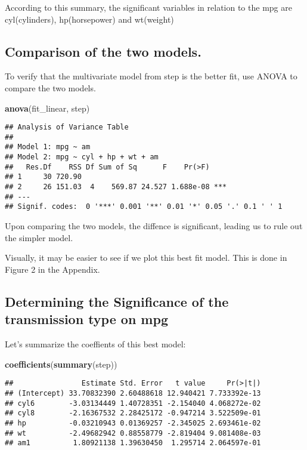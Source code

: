 \documentclass[]{article}
\newenvironment{Shaded}{\begin{snugshade}}{\end{snugshade}}
\newcommand{\KeywordTok}[1]{\textcolor[rgb]{0.13,0.29,0.53}{\textbf{#1}}}
\newcommand{\NormalTok}[1]{#1}
\begin{document}
According to this summary, the significant variables in relation to the
mpg are cyl(cylinders), hp(horsepower) and wt(weight)

\subsection{Comparison of the two
models.}\label{comparison-of-the-two-models.}

To verify that the multivariate model from step is the better fit, use
ANOVA to compare the two models.

\begin{Shaded}
\begin{Highlighting}[]
\KeywordTok{anova}\NormalTok{(fit_linear, step)}
\end{Highlighting}
\end{Shaded}

\begin{verbatim}
## Analysis of Variance Table
## 
## Model 1: mpg ~ am
## Model 2: mpg ~ cyl + hp + wt + am
##   Res.Df    RSS Df Sum of Sq      F    Pr(>F)    
## 1     30 720.90                                  
## 2     26 151.03  4    569.87 24.527 1.688e-08 ***
## ---
## Signif. codes:  0 '***' 0.001 '**' 0.01 '*' 0.05 '.' 0.1 ' ' 1
\end{verbatim}

Upon comparing the two models, the diffence is significant, leading us
to rule out the simpler model.

Visually, it may be easier to see if we plot this best fit model. This
is done in Figure 2 in the Appendix.

\subsection{Determining the Significance of the transmission type on
mpg}\label{determining-the-significance-of-the-transmission-type-on-mpg}

Let's summarize the coeffients of this best model:

\begin{Shaded}
\begin{Highlighting}[]
\KeywordTok{coefficients}\NormalTok{(}\KeywordTok{summary}\NormalTok{(step))}
\end{Highlighting}
\end{Shaded}

\begin{verbatim}
##                Estimate Std. Error   t value     Pr(>|t|)
## (Intercept) 33.70832390 2.60488618 12.940421 7.733392e-13
## cyl6        -3.03134449 1.40728351 -2.154040 4.068272e-02
## cyl8        -2.16367532 2.28425172 -0.947214 3.522509e-01
## hp          -0.03210943 0.01369257 -2.345025 2.693461e-02
## wt          -2.49682942 0.88558779 -2.819404 9.081408e-03
## am1          1.80921138 1.39630450  1.295714 2.064597e-01
\end{verbatim}
\end{document}
